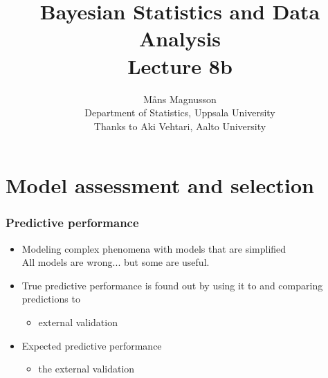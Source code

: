 \documentclass[10pt]{beamer}
\title[]{{\color{black}Bayesian Statistics and Data Analysis \\ Lecture 8b}}
\author[]{M{\aa}ns Magnusson \\ Department of Statistics, Uppsala University \\ Thanks to Aki Vehtari, Aalto University}
\date{}
\begin{document}
\frame{\titlepage
}



\section{Model assessment and selection}
\frame{\sectionpage}


\begin{frame}
\frametitle{Predictive performance}

\begin{itemize}
   \item<1-> Modeling complex phenomena with models that are simplified\\
   All models are wrong... but some are useful.
  \item<2-> True predictive performance is found out by using it to  and comparing predictions to 
    \begin{itemize}
      \item external validation
    \end{itemize}
  \item<3-> Expected predictive performance
    \begin{itemize}
      \item {} the external validation
    \end{itemize}
\end{itemize}

\end{frame}

\end{document}
